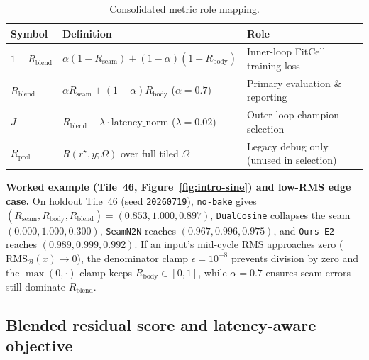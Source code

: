 \begin{table}[t]
  \centering
  \caption{Consolidated metric role mapping.}
  \label{tab:metric-roles}
  \setlength{\tabcolsep}{4pt}
  \footnotesize
  \begin{tabular}{@{}lll@{}}
    \toprule
    Symbol & Definition & Role \\
    \midrule
    $1{-}R_{\mathrm{blend}}$ & $\alpha(1{-}R_{\mathrm{seam}}){+}(1{-}\alpha)(1{-}R_{\mathrm{body}})$ & Inner-loop FitCell training loss \\
    $R_{\mathrm{blend}}$ & $\alpha R_{\mathrm{seam}}{+}(1{-}\alpha)R_{\mathrm{body}}$ ($\alpha{=}0.7$) & Primary evaluation \& reporting \\
    $J$ & $R_{\mathrm{blend}}-\lambda\cdot\mathrm{latency\_norm}$ ($\lambda{=}0.02$) & Outer-loop champion selection \\
    $R_{\mathrm{prol}}$ & $R(r^{\star},y;\Omega)$ over full tiled $\Omega$ & Legacy debug only (unused in selection) \\
    \bottomrule
  \end{tabular}
\end{table}

\textbf{Worked example (Tile~46, Figure~\ref{fig:intro-sine}) and low-RMS edge case.}
On holdout Tile~46 (seed \texttt{20260719}), \texttt{no-bake} gives $(R_{\mathrm{seam}},R_{\mathrm{body}},R_{\mathrm{blend}})=(0.853,1.000,0.897)$, \texttt{DualCosine} collapses the seam $(0.000,1.000,0.300)$, \texttt{SeamN2N} reaches $(0.967,0.996,0.975)$, and \texttt{Ours E2} reaches $(0.989,0.999,0.992)$.
If an input's mid-cycle RMS approaches zero ($\mathrm{RMS}_{\mathcal{B}}(x)\to 0$), the denominator clamp $\epsilon{=}10^{-8}$ prevents division by zero and the $\max(0,\cdot)$ clamp keeps $R_{\mathrm{body}}\in[0,1]$, while $\alpha{=}0.7$ ensures seam errors still dominate $R_{\mathrm{blend}}$.

\subsection{Blended residual score and latency-aware objective}
\label{sec:residual-score}

